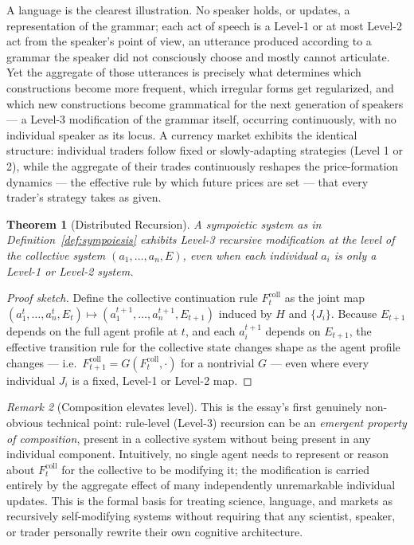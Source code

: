 \documentclass[12pt,a4paper]{article}
\theoremstyle{plain}
\newtheorem{theorem}{Theorem}[section]
\theoremstyle{definition}
\theoremstyle{remark}
\newtheorem{remark}[theorem]{Remark}
\begin{document}
A language is the clearest illustration. No speaker holds, or updates, a representation of the grammar; each act of speech is a Level-1 or at most Level-2 act from the speaker's point of view, an utterance produced according to a grammar the speaker did not consciously choose and mostly cannot articulate. Yet the aggregate of those utterances is precisely what determines which constructions become more frequent, which irregular forms get regularized, and which new constructions become grammatical for the next generation of speakers — a Level-3 modification of the grammar itself, occurring continuously, with no individual speaker as its locus. A currency market exhibits the identical structure: individual traders follow fixed or slowly-adapting strategies (Level 1 or 2), while the aggregate of their trades continuously reshapes the price-formation dynamics — the effective rule by which future prices are set — that every trader's strategy takes as given.

\begin{theorem}[Distributed Recursion]
\label{thm:distributed-recursion}
A sympoietic system as in Definition~\ref{def:sympoiesis} exhibits Level-3 recursive modification at the level of the collective system $(a_1,\ldots,a_n,E)$, even when each individual $a_i$ is only a Level-1 or Level-2 system.
\end{theorem}

\begin{proof}[Proof sketch]
Define the collective continuation rule $F^{\text{coll}}_t$ as the joint map $(a_1^t,\ldots,a_n^t,E_t) \mapsto (a_1^{t+1},\ldots,a_n^{t+1},E_{t+1})$ induced by $H$ and $\{J_i\}$. Because $E_{t+1}$ depends on the full agent profile at $t$, and each $a_i^{t+1}$ depends on $E_{t+1}$, the effective transition rule for the collective state changes shape as the agent profile changes — i.e.\ $F^{\text{coll}}_{t+1} = G(F^{\text{coll}}_t, \cdot)$ for a nontrivial $G$ — even where every individual $J_i$ is a fixed, Level-1 or Level-2 map.
\end{proof}

\begin{remark}[Composition elevates level]
\label{rem:composition-elevates}
This is the essay's first genuinely non-obvious technical point: rule-level (Level-3) recursion can be an \emph{emergent property of composition}, present in a collective system without being present in any individual component. Intuitively, no single agent needs to represent or reason about $F^{\text{coll}}_t$ for the collective to be modifying it; the modification is carried entirely by the aggregate effect of many independently unremarkable individual updates. This is the formal basis for treating science, language, and markets as recursively self-modifying systems without requiring that any scientist, speaker, or trader personally rewrite their own cognitive architecture.
\end{remark}
\end{document}
